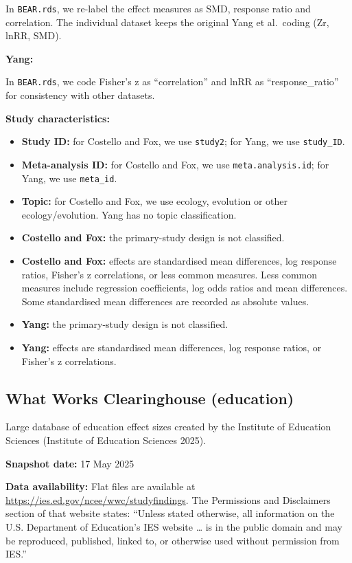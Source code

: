 \documentclass[
  11pt,
]{article}
\begin{document}
In \texttt{BEAR.rds}, we re-label the effect measures as SMD, response
ratio and correlation. The individual dataset keeps the original Yang et
al.~coding (Zr, lnRR, SMD).

\textbf{Yang:}

In \texttt{BEAR.rds}, we code Fisher's z as ``correlation'' and lnRR as
``response\_ratio'' for consistency with other datasets.

\textbf{Study characteristics:}

\begin{itemize}
\item
  \textbf{Study ID:} for Costello and Fox, we use \texttt{study2}; for
  Yang, we use \texttt{study\_ID}.
\item
  \textbf{Meta-analysis ID:} for Costello and Fox, we use
  \texttt{meta.analysis.id}; for Yang, we use \texttt{meta\_id}.
\item
  \textbf{Topic:} for Costello and Fox, we use ecology, evolution or
  other ecology/evolution. Yang has no topic classification.
\item
  \textbf{Costello and Fox:} the primary-study design is not classified.
\item
  \textbf{Costello and Fox:} effects are standardised mean differences,
  log response ratios, Fisher's z correlations, or less common measures.
  Less common measures include regression coefficients, log odds ratios
  and mean differences. Some standardised mean differences are recorded
  as absolute values.
\item
  \textbf{Yang:} the primary-study design is not classified.
\item
  \textbf{Yang:} effects are standardised mean differences, log response
  ratios, or Fisher's z correlations.
\end{itemize}

\newpage

\subsection{What Works Clearinghouse
(education)}\label{what-works-clearinghouse-education}

Large database of education effect sizes created by the Institute of
Education Sciences (Institute of Education Sciences 2025).

\textbf{Snapshot date:} 17 May 2025

\textbf{Data availability:} Flat files are available at
\url{https://ies.ed.gov/ncee/wwc/studyfindings}. The Permissions and
Disclaimers section of that website states: ``Unless stated otherwise,
all information on the U.S. Department of Education's IES website
\ldots{} is in the public domain and may be reproduced, published,
linked to, or otherwise used without permission from IES.''
\end{document}
